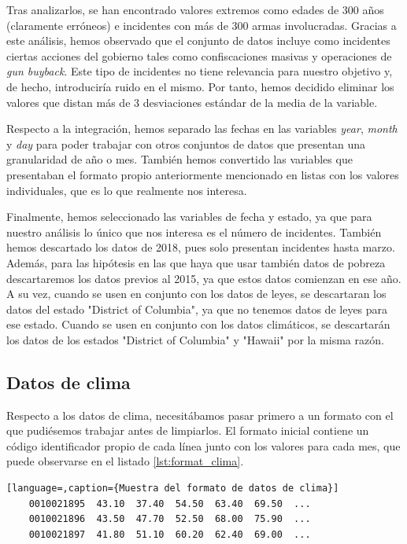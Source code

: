 \documentclass[11pt,a4paper]{article}
\begin{document}
Tras analizarlos, se han encontrado valores extremos como edades de 300 años (claramente erróneos) e incidentes con más de 300 armas involucradas. Gracias a este análisis, hemos observado que el conjunto de datos incluye como incidentes ciertas acciones del gobierno tales como confiscaciones masivas y operaciones de \textit{gun buyback}. Este tipo de incidentes no tiene relevancia para nuestro objetivo y, de hecho, introduciría ruido en el mismo. Por tanto, hemos decidido eliminar los valores que distan más de 3 desviaciones estándar de la media de la variable.

Respecto a la integración, hemos separado las fechas en las variables \textit{year}, \textit{month} y \textit{day} para poder trabajar con otros conjuntos de datos que presentan una granularidad de año o mes. También hemos convertido las variables que presentaban el formato propio anteriormente mencionado en listas con los valores individuales, que es lo que realmente nos interesa.

Finalmente, hemos seleccionado las variables de fecha y estado, ya que para nuestro análisis lo único que nos interesa es el número de incidentes. También hemos descartado los datos de 2018, pues solo presentan incidentes hasta marzo. Además, para las hipótesis en las que haya que usar también datos de pobreza descartaremos los datos previos al 2015, ya que estos datos comienzan en ese año. A su vez, cuando se usen en conjunto con los datos de leyes, se descartaran los datos del estado "District of Columbia", ya que no tenemos datos de leyes para ese estado. Cuando se usen en conjunto con los datos climáticos, se descartarán los datos de los estados "District of Columbia" y "Hawaii" por la misma razón.

\subsection{Datos de clima}

Respecto a los datos de clima, necesitábamos pasar primero a un formato con el que pudiésemos trabajar antes de limpiarlos. El formato inicial contiene un código identificador propio de cada línea junto con los valores para cada mes, que puede observarse en el listado \ref{lst:format_clima}.

\begin{lstlisting}[language=,caption={Muestra del formato de datos de clima}]
    0010021895  43.10  37.40  54.50  63.40  69.50  ...
    0010021896  43.50  47.70  52.50  68.00  75.90  ...
    0010021897  41.80  51.10  60.20  62.40  69.00  ...
\end{lstlisting}
\label{lst:format_clima}
\end{document}
